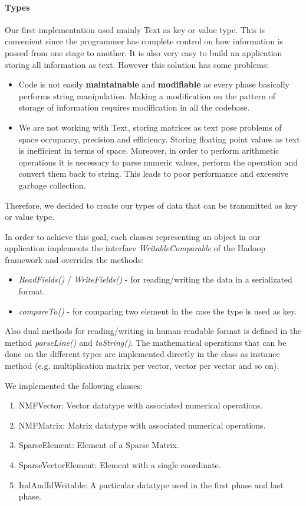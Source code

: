 \documentclass[a4paper,12pt]{article}
\newcommand{\METHOD}[1] {\textit{#1}}
\newcommand{\CLASS}[1] {\textit{#1}}
\begin{document}
\paragraph{Types}
Our first implementation used mainly Text as key or value type.
This is convenient since the programmer has complete control on how information is passed from one stage to another.
It is also very easy to build an application storing all information as text.
However this solution has some problems:
\begin{itemize}
\item Code is not easily \textbf{maintainable} and \textbf{modifiable} as every phase basically performs string manipulation. Making a modification on the pattern of storage of information requires modification in all the codebase.
\item We are not working with Text, storing matrices as text pose problems of space occupancy, precision and efficiency. 
Storing floating point values as text is inefficient in terms of space.
Moreover, in order to perform arithmetic operations it is necessary to parse numeric values, perform the operation and convert them back to string.
This leads to poor performance and excessive garbage collection.
\end{itemize}
Therefore, we decided to create our types of data that can be transmitted as key or value type.

In order to achieve this goal, each classes representing an object in our application implements the interface \CLASS{WritableComparable} of the Hadoop framework and overrides the methods:
\begin{itemize}
  \item \METHOD{ReadFields()} / \METHOD{WriteFields()} - for reading/writing the data in a serializated format.
  \item \METHOD{compareTo()} - for comparing two element in the case the type is used as key.
\end{itemize}

Also dual methods for reading/writing in human-readable format is defined in the method \METHOD{parseLine()} and \METHOD{toString()}.
The mathematical operations that can be done on the different types are implemented directly in the class as instance method (e.g. multiplication matrix per vector, vector per vector and so on).

We implemented the following classes:
\begin{enumerate}
  \item NMFVector: Vector datatype with associated numerical operations. 
  \item NMFMatrix: Matrix datatype with associated numerical operations.
  \item SparseElement: Element of a Sparse Matrix.
  \item SparseVectorElement: Element with a single coordinate.
  \item IndAndIdWritable: A particular datatype used in the first phase and last phase.
\end{enumerate}
\end{document}
